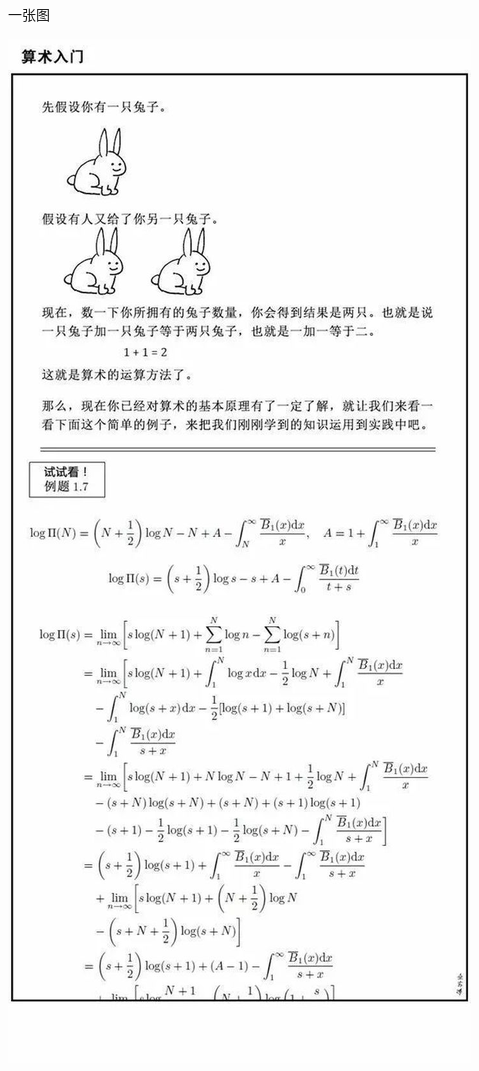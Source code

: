 \documentclass[presentation]{beamer}
\begin{document}
\begin{frame}[label={sec:orga35d86b}]{一张图}
\begin{center}
\begin{H}
\centering
\includegraphics[height=.8\textheight]{./3.jpeg}
\label{}
\end{H}
\end{center}
\end{frame}
\end{document}
